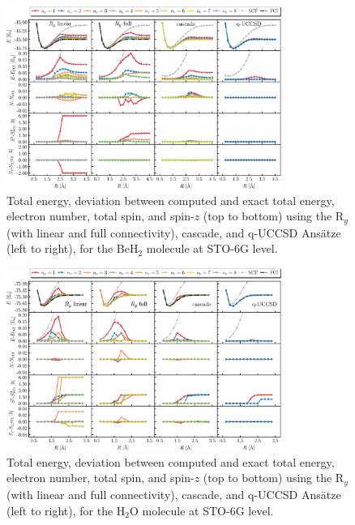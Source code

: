 \documentclass[aps,pra,twocolumn]{revtex4-2}
\begin{document}
\begin{figure}[t!]
\includegraphics[width=0.8\textwidth]{../figures/second_quantization_beh2/second_quantization_beh2.eps}
\caption{Total energy, deviation between computed and exact total energy, electron number, total spin, and spin-$z$ (top to bottom) 
using the R$_y$ (with linear and full connectivity), cascade, and q-UCCSD Ans\"{a}tze (left to right), for the BeH$_2$ molecule at STO-6G level.}
\label{figure:second_beh2}
\end{figure}

\begin{figure}[t!]
\includegraphics[width=0.8\textwidth]{../figures/second_quantization_h2o/second_quantization_h2o.eps}
\caption{Total energy, deviation between computed and exact total energy, electron number, total spin, and spin-$z$ (top to bottom) 
using the R$_y$ (with linear and full connectivity), cascade, and q-UCCSD Ans\"{a}tze (left to right), for the H$_2$O molecule at STO-6G level.}
\label{figure:second_h2o}
\end{figure} 
\end{document}
